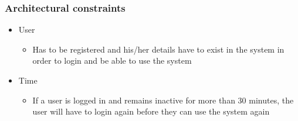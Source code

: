 \documentclass[a4paper,12pt]{article}
\begin{document}
\subsubsection{Architectural constraints}
	\begin{itemize}
		\item User
			\begin{itemize}
				\item Has to be registered and his/her details have to exist in the system in order to login and be able to use the system
			\end{itemize}
		\item Time
			\begin{itemize}
				\item If a user is logged in and remains inactive for more than 30 minutes, the user will have to login again before they can use the system again
			\end{itemize}
	\end{itemize}	

\end{document}
